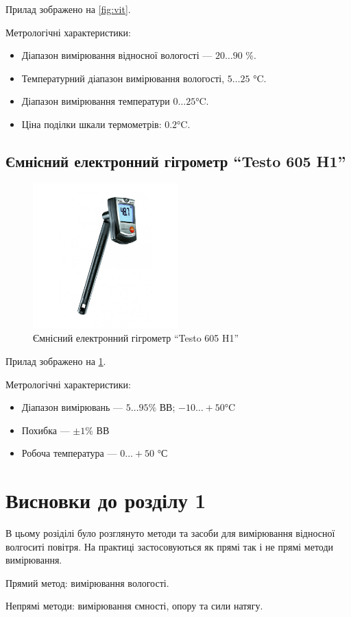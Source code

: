 Прилад зображено на \ref{fig:vit}.

Метрологічні характеристики:
\begin{itemize}
\item Діапазон вимірювання відносної вологості --- $20 \ldots 90$ \%.
\item Температурний діапазон вимірювання вологості,  $5 \ldots 25$ °C.
\item Діапазон вимірювання температури $0 \ldots 25$°C.
\item Ціна поділки шкали термометрів:  $0.2$°C.
\end{itemize}

\subsection{Ємнісний електронний гігрометр ``Testo 605 H1''}
\begin{figure}[!ht]
\centering
\includegraphics[width=0.5\textwidth]{./images/testo.jpg}
\caption{Ємнісний електронний гігрометр ``Testo 605 H1''}
\label{fig:testo}
\end{figure}

Прилад зображено на \ref{fig:testo}.

Метрологічні характеристики:
\begin{itemize}
\item Діапазон вимірювань --- $5 \ldots 95 \%$ ВВ;  $-10 \ldots +50$°C
\item Похибка --- $\pm 1\%$ ВВ
\item Робоча температура ---  $0 \ldots +50$ °С
\end{itemize}


\section*{Висновки до розділу 1}

В цьому розіділі було розглянуто методи та засоби для вимірювання відносної волгоситі повітря.
На практиці застосовуються як прямі так і не прямі методи вимірювання.

Прямий метод: вимірювання вологості.

Непрямі методи: вимірювання ємності, опору та сили натягу.